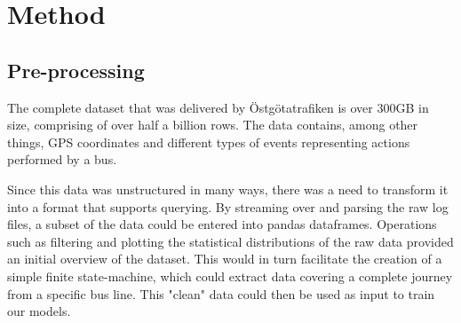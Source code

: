 
\chapter{Method}
\label{cha:method}

\section{Pre-processing}\label{pre-processing}
\label{sec:pre-processing}
The complete dataset that was delivered by Östgötatrafiken is over 300GB in size, comprising of over half a billion rows. The data contains, among other things, GPS coordinates and different types of events representing actions performed by a bus. 

Since this data was unstructured in many ways, there was a need to transform it into a format that supports querying. By streaming over and parsing the raw log files, a subset of the data could be entered into pandas dataframes. Operations such as filtering and plotting the statistical distributions of the raw data provided an initial overview of the dataset. This would in turn facilitate the creation of a simple finite state-machine, which could extract data covering a complete journey from a specific bus line. This "clean" data could then be used as input to train our models.

